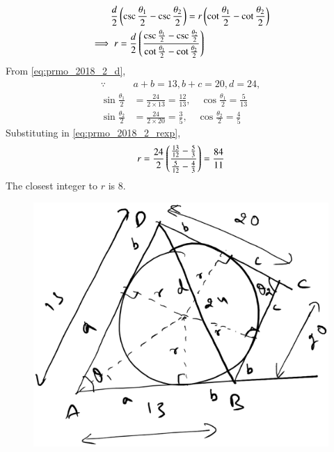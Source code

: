 \documentclass[journal,12pt,twocolumn]{IEEEtran}
\begin{document}
\begin{enumerate}[label=\arabic*]
\begin{align}
\label{eq:prmo_2018_2_rd}
\frac{d}{2} &\brak{\csc \frac{\theta_1}{2}-\csc \frac{\theta_2}{2}} = r\brak{\cot \frac{\theta_1}{2} -\cot \frac{\theta_2}{2}}
\\
\implies r &= \frac{d}{2} \brak{\frac{\csc \frac{\theta_1}{2}-\csc \frac{\theta_2}{2}}{\cot \frac{\theta_1}{2} -\cot \frac{\theta_2}{2}}}
\label{eq:prmo_2018_2_rexp}
\end{align}
From \eqref{eq:prmo_2018_2_d},
\begin{align}
\label{eq:prmo_2018_2_angs}
\because &a+b = 13, b+c = 20, d = 24,
\\
\sin\frac{\theta_1}{2} & = \frac{24}{2\times 13} = \frac{12}{13}, \quad \cos\frac{\theta_1}{2} = \frac{5}{13}
\\
\sin\frac{\theta_2}{2} & = \frac{24}{2\times 20	} = \frac{3}{5}, \quad \cos\frac{\theta_2}{2}=\frac{4}{5}
\end{align}
%
Substituting in \eqref{eq:prmo_2018_2_rexp},
\begin{align}
r = \frac{24}{2} \left(\frac{\frac{13}{12}- \frac{5}{3}}{ \frac{5}{12} - \frac{4}{3}}\right) = \frac{84}{11}
\end{align}
%
The closest integer to $r$ is 8.
\begin{figure}[!ht]
\centering
\includegraphics[width=\columnwidth]{./figs/prmo_2018_2.eps}
\caption{}
\label{fig:prmo_2018_2}
\end{figure}


\end{enumerate}
\end{document}
